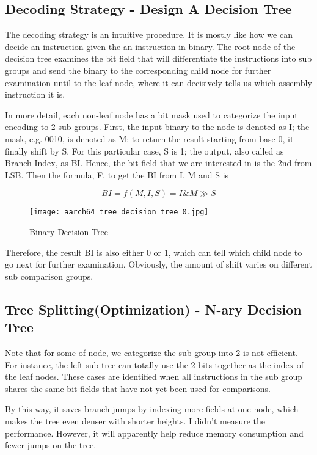 \documentclass[]{article}
\begin{document}
\subsection{Decoding Strategy - Design A Decision Tree}
The decoding strategy is an intuitive procedure. It is mostly like how we can decide an instruction given the an instruction in binary. The root node of the decision tree examines the bit field that will differentiate the instructions into sub groups and send the binary to the corresponding child node for further examination until to the leaf node, where it can decisively tells us which assembly instruction it is.
	
In more detail, each non-leaf node has a bit mask used to categorize the input encoding to 2 sub-groups. First, the input binary to the node is denoted as I; the mask, e.g. 0010, is denoted as M; to return the result starting from base 0, it finally shift by S. For this particular case, S is 1; the output, also called as Branch Index, as BI. Hence, the bit field that we are interested in is the 2nd from LSB. Then the formula, F, to get the BI from I, M and S is

\begin{equation*}
BI = f(M, I, S) = I \& M \gg S
\end{equation*}

\begin{figure}[h]
	\texttt{[image: aarch64\_tree\_decision\_tree\_0.jpg]}
	\caption{Binary Decision Tree}
	\label{fig:bindecisiontree}
\end{figure}

Therefore, the result BI is also either 0 or 1, which can tell which child node to go next for further examination. Obviously, the amount of shift varies on different sub comparison groups.

\subsection{Tree Splitting(Optimization) - N-ary Decision Tree}
Note that for some of node, we categorize the sub group into 2 is not efficient. For instance, the left sub-tree can totally use the 2 bits together as the index of the leaf nodes. These cases are identified when all instructions in the sub group shares the same bit fields that have not yet been used for comparisons.

By this way, it saves branch jumps by indexing more fields at one node, which makes the tree even denser with shorter heights. I didn't measure the performance. However, it will apparently help reduce memory consumption and fewer jumps on the tree.
\end{document}
